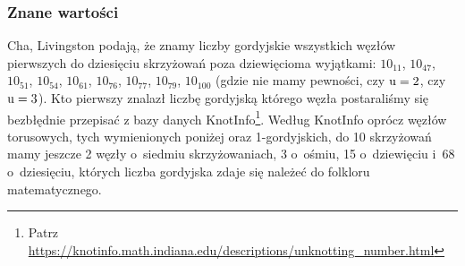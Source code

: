 
\subsubsection{Znane wartości}
Cha, Livingston \cite{cha2018} podają, że znamy liczby gordyjskie wszystkich węzłów pierwszych do dziesięciu skrzyżowań poza dziewięcioma wyjątkami: $10_{11}$, $10_{47}$, $10_{51}$, $10_{54}$, $10_{61}$, $10_{76}$, $10_{77}$, $10_{79}$, $10_{100}$ (gdzie nie mamy pewności, czy $\operatorname{u} = 2$, czy $\operatorname{u} = 3$).
%
%
Kto pierwszy znalazł liczbę gordyjską którego węzła postaraliśmy się bezbłędnie przepisać z bazy danych KnotInfo\footnote{Patrz \url{https://knotinfo.math.indiana.edu/descriptions/unknotting_number.html}}.
Według KnotInfo oprócz węzłów torusowych, tych wymienionych poniżej oraz 1-gordyjskich, do 10 skrzyżowań mamy jeszcze 2 węzły o~siedmiu skrzyżowaniach, 3 o~ośmiu, 15 o~dziewięciu i~68 o~dziesięciu, których liczba gordyjska zdaje się należeć do folkloru matematycznego.

